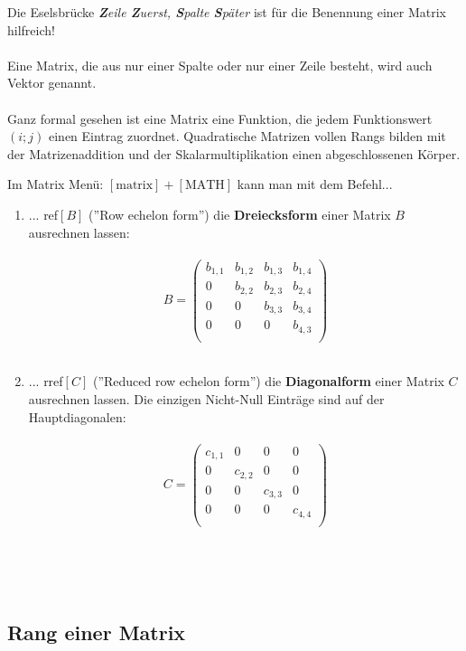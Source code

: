 \documentclass[../MAIN/main.tex]{subfiles}
\begin{document}
\begin{Bemerkung}
Die Eselsbrücke \textit{\textbf{Z}eile \textbf{Z}uerst, \textbf{S}palte \textbf{S}päter} ist für die Benennung einer Matrix hilfreich!\\\\
Eine Matrix, die aus nur einer Spalte oder nur einer Zeile besteht, wird auch Vektor genannt.\\\\
Ganz formal gesehen ist eine Matrix eine Funktion, die jedem Funktionswert $(i;j)$ einen Eintrag zuordnet. Quadratische Matrizen vollen Rangs bilden mit der Matrizenaddition und der Skalarmultiplikation einen abgeschlossenen Körper.
\end{Bemerkung}


\begin{GTR-Tipp}
Im Matrix Menü: $[\text{matrix}] + [\text{MATH}]$ kann man mit dem Befehl...\\
\begin{enumerate}
\item ... ref$[B]$ (''Row echelon form'') die \textbf{Dreiecksform} einer Matrix $B$ ausrechnen lassen:\\\\
$$B= \begin{pmatrix}
b_{1,1}&b_{1,2}&b_{1,3}&b_{1,4}\\
0&b_{2,2}&b_{2,3}&b_{2,4}\\
0&0&b_{3,3}&b_{3,4}\\
0&0&0&b_{4,3}\\
\end{pmatrix}$$\\
\item ... rref$[C]$ (''Reduced row echelon form'') die \textbf{Diagonalform} einer Matrix $C$ ausrechnen lassen. Die einzigen Nicht-Null Einträge sind auf der Hauptdiagonalen:\\\\
$$C= \begin{pmatrix}
c_{1,1}&0&0&0\\
0&c_{2,2}&0&0\\
0&0&c_{3,3}&0\\
0&0&0&c_{4,4}\\
\end{pmatrix}$$\\
\end{enumerate}
\end{GTR-Tipp}\\
\\

\subsection{Rang einer Matrix}
\end{document}
